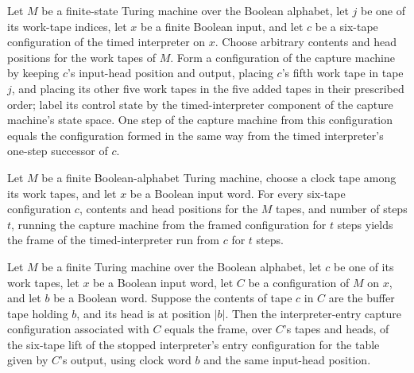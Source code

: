 \begin{lemma}
\label{Turing.timedFrame_step}
\leanok
{}
Let $M$ be a finite-state Turing machine over the Boolean alphabet, let $j$ be one of
its work-tape indices, let $x$ be a finite Boolean input, and let $c$ be a six-tape
configuration of the timed interpreter on $x$. Choose arbitrary contents and head
positions for the work tapes of $M$. Form a configuration of the capture machine by
keeping $c$’s input-head position and output, placing $c$’s fifth work tape in tape $j$,
and placing its other five work tapes in the five added tapes in their prescribed order;
label its control state by the timed-interpreter component of the capture machine’s
state space. One step of the capture machine from this configuration equals the
configuration formed in the same way from the timed interpreter’s one-step successor of
$c$.
\end{lemma}

\begin{lemma}
\label{Turing.timedFrame_run}
\leanok
{}
Let $M$ be a finite Boolean-alphabet Turing machine, choose a clock tape among its work
tapes, and let $x$ be a Boolean input word. For every six-tape configuration $c$,
contents and head positions for the $M$ tapes, and number of steps $t$, running the
capture machine from the framed configuration for $t$ steps yields the frame of the
timed-interpreter run from $c$ for $t$ steps.
\end{lemma}

\begin{lemma}
\label{Turing.timedCaptured_frame}
\leanok
{}
Let $M$ be a finite Turing machine over the Boolean alphabet, let $c$ be one of its work
tapes, let $x$ be a Boolean input word, let $C$ be a configuration of $M$ on $x$, and
let $b$ be a Boolean word. Suppose the contents of tape $c$ in $C$ are the buffer tape
holding $b$, and its head is at position $|b|$. Then the interpreter-entry capture
configuration associated with $C$ equals the frame, over $C$'s tapes and heads, of the
six-tape lift of the stopped interpreter's entry configuration for the table given by
$C$'s output, using clock word $b$ and the same input-head position.
\end{lemma}

